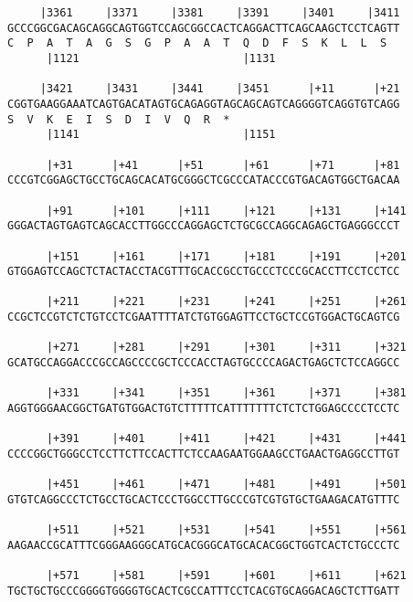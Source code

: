 \documentclass{article}
\begin{document}
\begin{Verbatim}
     |3361     |3371     |3381     |3391     |3401     |3411
GCCCGGCGACAGCAGGCAGTGGTCCAGCGGCCACTCAGGACTTCAGCAAGCTCCTCAGTT
C  P  A  T  A  G  S  G  P  A  A  T  Q  D  F  S  K  L  L  S  
      |1121                         |1131                   
  
     |3421     |3431     |3441     |3451      |+11      |+21
CGGTGAAGGAAATCAGTGACATAGTGCAGAGGTAGCAGCAGTCAGGGGTCAGGTGTCAGG
S  V  K  E  I  S  D  I  V  Q  R  *   
      |1141                         |1151                   
  
      |+31      |+41      |+51      |+61      |+71      |+81
CCCGTCGGAGCTGCCTGCAGCACATGCGGGCTCGCCCATACCCGTGACAGTGGCTGACAA
                                                            
      |+91      |+101     |+111     |+121     |+131     |+141
GGGACTAGTGAGTCAGCACCTTGGCCCAGGAGCTCTGCGCCAGGCAGAGCTGAGGGCCCT
                                                            
      |+151     |+161     |+171     |+181     |+191     |+201
GTGGAGTCCAGCTCTACTACCTACGTTTGCACCGCCTGCCCTCCCGCACCTTCCTCCTCC
                                                            
      |+211     |+221     |+231     |+241     |+251     |+261
CCGCTCCGTCTCTGTCCTCGAATTTTATCTGTGGAGTTCCTGCTCCGTGGACTGCAGTCG
                                                            
      |+271     |+281     |+291     |+301     |+311     |+321
GCATGCCAGGACCCGCCAGCCCCGCTCCCACCTAGTGCCCCAGACTGAGCTCTCCAGGCC
                                                            
      |+331     |+341     |+351     |+361     |+371     |+381
AGGTGGGAACGGCTGATGTGGACTGTCTTTTTCATTTTTTTCTCTCTGGAGCCCCTCCTC
                                                            
      |+391     |+401     |+411     |+421     |+431     |+441
CCCCGGCTGGGCCTCCTTCTTCCACTTCTCCAAGAATGGAAGCCTGAACTGAGGCCTTGT
                                                            
      |+451     |+461     |+471     |+481     |+491     |+501
GTGTCAGGCCCTCTGCCTGCACTCCCTGGCCTTGCCCGTCGTGTGCTGAAGACATGTTTC
                                                            
      |+511     |+521     |+531     |+541     |+551     |+561
AAGAACCGCATTTCGGGAAGGGCATGCACGGGCATGCACACGGCTGGTCACTCTGCCCTC
                                                            
      |+571     |+581     |+591     |+601     |+611     |+621
TGCTGCTGCCCGGGGTGGGGTGCACTCGCCATTTCCTCACGTGCAGGACAGCTCTTGATT
                                                            

\end{Verbatim}
\end{document}
